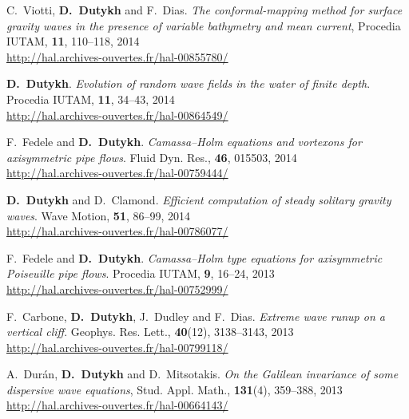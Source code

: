 \begin{etaremune}
  \item C.~Viotti, \textbf{D.~Dutykh} and F.~Dias. \textit{The conformal-mapping method for surface gravity waves in the presence of variable bathymetry and mean current}, Procedia IUTAM, \textbf{11}, 110--118, 2014 \\ %
  \url{http://hal.archives-ouvertes.fr/hal-00855780/}
  
  \item \textbf{D.~Dutykh}. \textit{Evolution of random wave fields in the water of finite depth}. Procedia IUTAM, \textbf{11}, 34--43, 2014 \\ %
  \url{http://hal.archives-ouvertes.fr/hal-00864549/}
  
  \item F.~Fedele and \textbf{D.~Dutykh}. \textit{Camassa--Holm equations and vortexons for axisymmetric pipe flows}. Fluid Dyn. Res., \textbf{46}, 015503, 2014 \\ %
  \url{http://hal.archives-ouvertes.fr/hal-00759444/}

  \item \textbf{D.~Dutykh} and D.~Clamond. \textit{Efficient computation of steady solitary gravity waves}. Wave Motion, \textbf{51}, 86--99, 2014 \\ %
  \url{http://hal.archives-ouvertes.fr/hal-00786077/}


  \item F.~Fedele and \textbf{D.~Dutykh}. \textit{Camassa--Holm type equations for axisymmetric Poiseuille pipe flows}. Procedia IUTAM, \textbf{9}, 16--24, 2013 \\ %
  \url{http://hal.archives-ouvertes.fr/hal-00752999/}

  \item F.~Carbone, \textbf{D.~Dutykh}, J.~Dudley and F.~Dias. \textit{Extreme wave runup on a vertical cliff}. Geophys. Res. Lett., \textbf{40}(12), 3138--3143, 2013 \\ %
  \url{http://hal.archives-ouvertes.fr/hal-00799118/}

  \item A.~Dur\'an, \textbf{D.~Dutykh} and D.~Mitsotakis. \textit{On the Galilean invariance of some dispersive wave equations}, Stud. Appl. Math., \textbf{131}(4), 359--388, 2013 \\ %
  \url{http://hal.archives-ouvertes.fr/hal-00664143/}


\end{etaremune}
